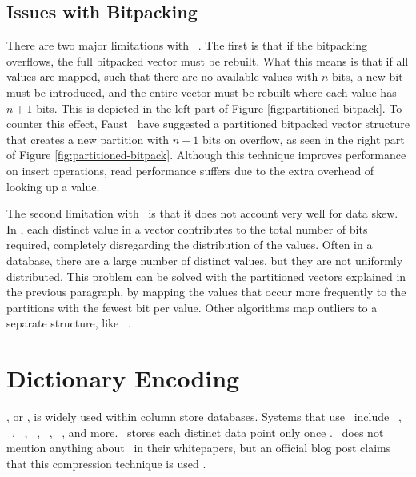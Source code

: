 \subsection{Issues with Bitpacking}
\label{sub:Issues with Bitpacking}
There are two major limitations with \bp~\cite{Faust2015-ke}. The first is that if the bitpacking overflows, the full bitpacked vector must be rebuilt. What this means is that if all values are mapped, such that there are no available values with $n$ bits, a new bit must be introduced, and the entire vector must be rebuilt where each value has $n + 1$ bits. This is depicted in the left part of Figure \ref{fig:partitioned-bitpack}. To counter this effect, Faust \ea~have suggested a partitioned bitpacked vector structure that creates a new partition with $n + 1$ bits on overflow, as seen in the right part of Figure \ref{fig:partitioned-bitpack}. Although this technique improves performance on insert operations, read performance suffers due to the extra overhead of looking up a value.

The second limitation with \bp~is that it does not account very well for data skew. In \bp, each distinct value in a vector contributes to the total number of bits required, completely disregarding the distribution of the values. Often in a database, there are a large number of distinct values, but they are not uniformly distributed. This problem can be solved with the partitioned vectors explained in the previous paragraph, by mapping the values that occur more frequently to the partitions with the fewest bit per value. Other algorithms map outliers to a separate structure, like \pfdelta~\cite{Bjorklund2011-wh}.



\section{Dictionary Encoding}
\label{sec:Dictionary Encoding}
\de, or , is widely used within column store databases. Systems that use \de~include \oracle~\cite{Lahiri2015-mz}, \ibm~\cite{Raman2013-em}, \saph~\cite{Farber2012-vh}, \sapnw~\cite{Lemke2010-is}, \blink~\cite{Johnson2008-cp}, \mssql~\cite{Larson2013-mc}, and more. \qlikview~stores each distinct data point only once \cite{Qlik2011-ef}. \tableau~does not mention anything about \de~in their whitepapers, but an official blog post claims that this compression technique is used \cite{noauthor_undated-us}.

